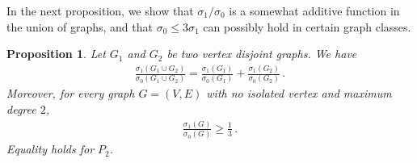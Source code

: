 \documentclass[a4paper,12pt]{amsart}
\newtheorem{proposition}[lemma]{Proposition}
\theoremstyle{remark}
\begin{document}
\medskip
In the next proposition, we show that $\sigma_1 /\sigma_0$ is a somewhat additive function in the union of graphs, and that $\sigma_0 \leq 3 \sigma_1$ can possibly hold in certain graph classes.

\begin{proposition}\label{prop:1sur3}
Let $G_1$ and $G_2$ be two vertex disjoint graphs. We have
\begin{align*}
\frac{ \sigma_1(G_1 \cup G_2)}{ \sigma_0(G_1 \cup G_2)}=\frac{ \sigma_1(G_1)}{ \sigma_0(G_1)}+\frac{ \sigma_1(G_2)}{ \sigma_0(G_2)}\,.
\end{align*}
Moreover, for every graph $G=(V,E)$ with no isolated vertex and maximum degree $2$,
\begin{align*}
\frac{\sigma_1(G)}{\sigma_0(G)}\geq \frac{1}{3}\,.
\end{align*}
Equality holds for $P_2$.
\end{proposition}
\end{document}
